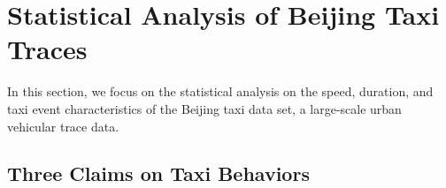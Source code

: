 \documentclass[10pt,journal,compsocconf,letterpaper]{IEEEtran}
\begin{document}




\section{Statistical Analysis of Beijing Taxi Traces}
\label{section_assumptions_anlysis}

In this section, we focus on the statistical analysis on the speed, duration, and taxi event characteristics of the Beijing taxi data set, a large-scale urban vehicular trace data.



\subsection{Three Claims on Taxi Behaviors}
\label{section_statistic_analysis}
\end{document}
